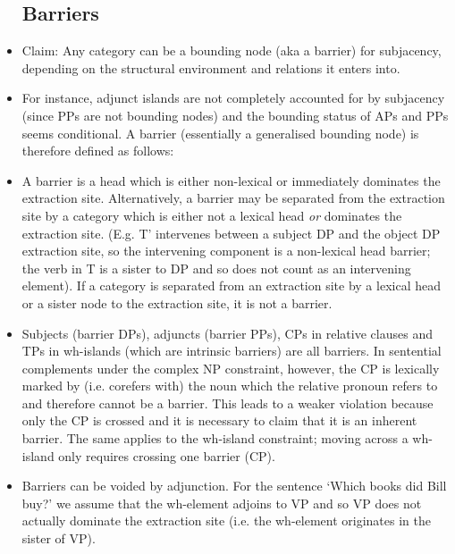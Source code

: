 \documentclass{article}
\begin{document}
\begin{itemize}
\subsection{Barriers}
    \item Claim: Any category can be a bounding node (aka a barrier) for subjacency, depending on the structural environment and relations it enters into.
    \item For instance, adjunct islands are not completely accounted for by subjacency (since PPs are not bounding nodes) and the bounding status of APs and PPs seems conditional. A barrier (essentially a generalised bounding node) is therefore defined as follows:
    \item A barrier is a head which is either non-lexical or immediately dominates the extraction site. Alternatively, a barrier may be separated from the extraction site by a category which is either not a lexical head \textit{or} dominates the extraction site. (E.g. T' intervenes between a subject DP and the object DP extraction site, so the intervening component is a non-lexical head barrier; the verb in T is a sister to DP and so does not count as an intervening element). If a category is separated from an extraction site by a lexical head or a sister node to the extraction site, it is not a barrier.
    \item Subjects (barrier DPs), adjuncts (barrier PPs), CPs in relative clauses and TPs in wh-islands (which are intrinsic barriers) are all barriers. In sentential complements under the complex NP constraint, however, the CP is lexically marked by (i.e. corefers with) the noun which the relative pronoun refers to and therefore cannot be a barrier. This leads to a weaker violation because only the CP is crossed and it is necessary to claim that it is an inherent barrier. The same applies to the wh-island constraint; moving across a wh-island only requires crossing one barrier (CP).
    \item Barriers can be voided by adjunction. For the sentence `Which books did Bill buy?' we assume that the wh-element adjoins to VP and so VP does not actually dominate the extraction site (i.e. the wh-element originates in the sister of VP).
\end{itemize}
\end{document}
